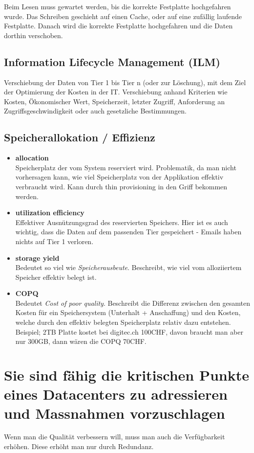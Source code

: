 Beim Lesen muss gewartet werden, bis die korrekte Festplatte hochgefahren wurde. Das Schreiben geschieht auf einen Cache, oder auf eine zufällig laufende Festplatte. Danach wird die korrekte Festplatte hochgefahren und die Daten dorthin verschoben.

\subsection{Information Lifecycle Management (ILM)}
Verschiebung der Daten von Tier 1 bis Tier n (oder zur Löschung), mit dem Ziel der Optimierung der Kosten in der IT. Verschiebung anhand Kriterien wie Kosten, Ökonomischer Wert, Speicherzeit, letzter Zugriff, Anforderung an Zugriffsgeschwindigkeit oder auch gesetzliche Bestimmungen.

\subsection{Speicherallokation / Effizienz}\label{sec:speichereffizienz}
\begin{itemize}
	\item \textbf{allocation} \\
		Speicherplatz der vom System reserviert wird. Problematik, da man nicht vorhersagen kann, wie viel Speicherplatz von der Applikation effektiv verbraucht wird. Kann durch thin provisioning in den Griff bekommen werden.
	\item \textbf{utilization efficiency} \\
		Effektiver Ausnützungsgrad des reservierten Speichers. Hier ist es auch wichtig, dass die Daten auf dem passenden Tier gespeichert - Emails haben nichts auf Tier 1 verloren. 
	\item \textbf{storage yield} \\
		Bedeutet so viel wie \emph{Speicherausbeute}. Beschreibt, wie viel vom alloziiertem Speicher effektiv belegt ist.
	\item \textbf{COPQ} \\
		Bedeutet \emph{Cost of poor quality}. Beschreibt die Differenz zwischen den gesamten Kosten für ein Speichersystem (Unterhalt + Anschaffung) und den Kosten, welche durch den effektiv belegten Speicherplatz relativ dazu entstehen. Beispiel; 2TB Platte kostet bei digitec.ch 100CHF, davon braucht man aber nur 300GB, dann wären die COPQ 70CHF.
\end{itemize}

\section{Sie sind fähig die kritischen Punkte eines Datacenters zu adressieren und Massnahmen vorzuschlagen}
Wenn man die Qualität verbessern will, muss man auch die Verfügbarkeit erhöhen. Diese erhöht man nur durch Redundanz.

